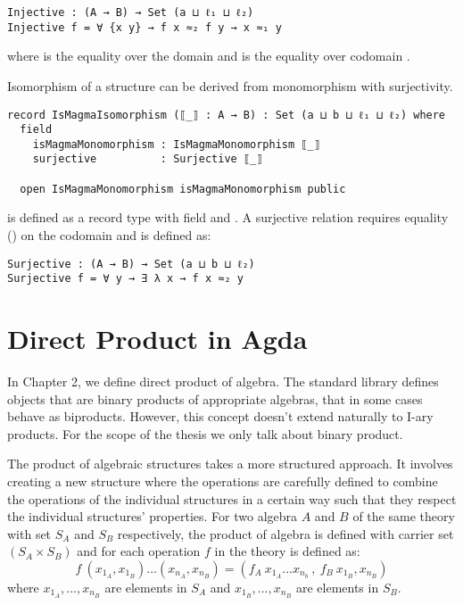 \begin{verbatim}
Injective : (A → B) → Set (a ⊔ ℓ₁ ⊔ ℓ₂)
Injective f = ∀ {x y} → f x ≈₂ f y → x ≈₁ y
\end{verbatim}

where  is the equality over the domain  and 
is the equality over codomain .

Isomorphism of a structure can be derived from monomorphism with surjectivity.

\begin{verbatim}
record IsMagmaIsomorphism (⟦_⟧ : A → B) : Set (a ⊔ b ⊔ ℓ₁ ⊔ ℓ₂) where
  field
    isMagmaMonomorphism : IsMagmaMonomorphism ⟦_⟧
    surjective          : Surjective ⟦_⟧

  open IsMagmaMonomorphism isMagmaMonomorphism public
\end{verbatim} 

 is defined as a record type with field
 and . A surjective relation
requires equality () on the codomain  and is defined as:

\begin{verbatim}
Surjective : (A → B) → Set (a ⊔ b ⊔ ℓ₂)
Surjective f = ∀ y → ∃ λ x → f x ≈₂ y
\end{verbatim}

\section{Direct Product in Agda}
In Chapter 2, we define direct product of algebra. The standard library defines
objects that are binary products of appropriate algebras, that in some cases
behave as biproducts. However, this concept doesn't extend naturally to I-ary
products. For the scope of the thesis we only talk about binary product. 

The product of algebraic structures takes a more structured approach. It
involves creating a new structure where the operations are carefully defined to
combine the operations of the individual structures in a certain way such that
they respect the individual structures' properties. For two algebra $A$ and $B$
of the same theory with set $S_A$ and $S_B$ respectively, the product of algebra
is defined with carrier set $(S_A \times S_B)$ and for each operation $f$ in the
theory is defined as:
\[f\ (x_{1_A},x_{1_B})...(x_{n_A},x_{n_B}) = (f_A\ x_{1_A}...x_{n_b}\ ,\ f_B\
x_{1_B},x_{n_B} )\] where $x_{1_A},...,x_{n_B}$ are elements in $S_A$ and
$x_{1_B},...,x_{n_B}$ are elements in $S_B$. 

